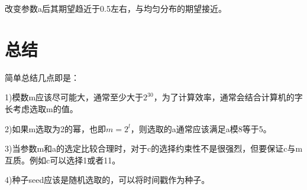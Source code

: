 \documentclass[12pt,a4paper]{article}%
\begin{document}
    改变参数a后其期望趋近于0.5左右，与均匀分布的期望接近。


    \section{总结}

    简单总结几点即是：

    1)模数m应该尽可能大，通常至少大于$2^{30}$，为了计算效率，通常会结合计算机的字长考虑选取m的值。

    2)如果m选取为2的幂，也即$m=2^l$，则选取的a通常应该满足a模8等于5。

    3)当参数m和a的选定比较合理时，对于c的选择约束性不是很强烈，但要保证c与m互质。例如c可以选择1或者11。

    4)种子seed应该是随机选取的，可以将时间戳作为种子。
\end{document}
